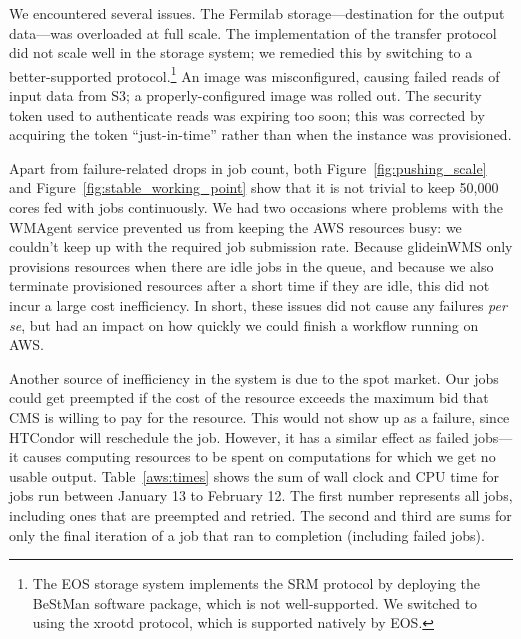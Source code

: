 \documentclass[twocolumn]{svjour3}          %
\begin{document}
We encountered several issues. The Fermilab storage---destination for the output data---was overloaded at full scale. The implementation of the transfer protocol did not scale well in the storage system; we remedied this by switching to a better-supported protocol.\footnote{The EOS storage system \cite{eos} implements the SRM protocol by deploying the BeStMan \cite{bestman} software package, which is not well-supported. We switched to using the xrootd protocol, which
is supported natively by EOS.}
An image was misconfigured, causing failed reads of input data from S3; a properly-configured image was rolled out.
The security token used to authenticate reads was expiring too soon; this was corrected by acquiring the token ``just-in-time'' rather than when the instance was
provisioned.

Apart from failure-related drops in job count, both Figure~\ref{fig:pushing_scale} and Figure~\ref{fig:stable_working_point} show that it is not trivial to keep 50,000 cores fed with jobs continuously. We had two occasions where problems with the WMAgent service prevented us from keeping the AWS resources busy: we couldn't keep up with the required job submission rate.
Because glideinWMS only provisions resources when there are idle jobs in the queue, and because we also terminate provisioned resources after a short
time if they are idle, this did not incur a large cost inefficiency. In short, these issues did not cause any failures \textit{per se}, but had an impact on how quickly we could finish a workflow running on AWS.

Another source of inefficiency in the system is due to the spot market. Our jobs could get preempted if the cost of the resource exceeds the maximum bid that CMS is willing to pay for the resource. This would not show up as a failure, since HTCondor will reschedule the job. However, it has a similar effect as failed jobs---it causes computing resources to be spent on computations for which we get no usable output. Table~\ref{aws:times} shows the sum of wall clock and CPU time for jobs run between January 13 to February 12. The first number represents all jobs, including ones that are preempted and retried. The second and third are sums for only the final iteration of a job that ran to completion (including failed jobs).
\end{document}
